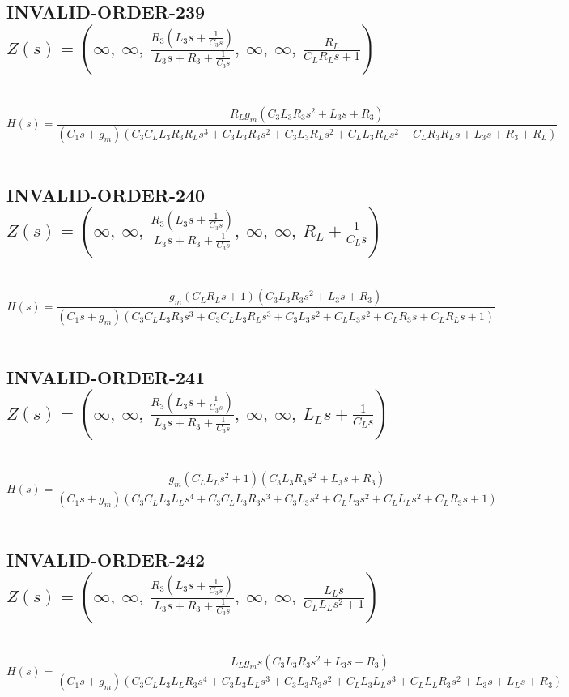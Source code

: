 \documentclass{article}
\begin{document}
\subsection{INVALID-ORDER-239 $Z(s) = \left( \infty, \  \infty, \  \frac{R_{3} \left(L_{3} s + \frac{1}{C_{3} s}\right)}{L_{3} s + R_{3} + \frac{1}{C_{3} s}}, \  \infty, \  \infty, \  \frac{R_{L}}{C_{L} R_{L} s + 1}\right)$ } \ 
\textbf{\[H(s) = \frac{R_{L} g_{m} \left(C_{3} L_{3} R_{3} s^{2} + L_{3} s + R_{3}\right)}{\left(C_{1} s + g_{m}\right) \left(C_{3} C_{L} L_{3} R_{3} R_{L} s^{3} + C_{3} L_{3} R_{3} s^{2} + C_{3} L_{3} R_{L} s^{2} + C_{L} L_{3} R_{L} s^{2} + C_{L} R_{3} R_{L} s + L_{3} s + R_{3} + R_{L}\right)}\] } \ 
\subsection{INVALID-ORDER-240 $Z(s) = \left( \infty, \  \infty, \  \frac{R_{3} \left(L_{3} s + \frac{1}{C_{3} s}\right)}{L_{3} s + R_{3} + \frac{1}{C_{3} s}}, \  \infty, \  \infty, \  R_{L} + \frac{1}{C_{L} s}\right)$ } \ 
\textbf{\[H(s) = \frac{g_{m} \left(C_{L} R_{L} s + 1\right) \left(C_{3} L_{3} R_{3} s^{2} + L_{3} s + R_{3}\right)}{\left(C_{1} s + g_{m}\right) \left(C_{3} C_{L} L_{3} R_{3} s^{3} + C_{3} C_{L} L_{3} R_{L} s^{3} + C_{3} L_{3} s^{2} + C_{L} L_{3} s^{2} + C_{L} R_{3} s + C_{L} R_{L} s + 1\right)}\] } \ 
\subsection{INVALID-ORDER-241 $Z(s) = \left( \infty, \  \infty, \  \frac{R_{3} \left(L_{3} s + \frac{1}{C_{3} s}\right)}{L_{3} s + R_{3} + \frac{1}{C_{3} s}}, \  \infty, \  \infty, \  L_{L} s + \frac{1}{C_{L} s}\right)$ } \ 
\textbf{\[H(s) = \frac{g_{m} \left(C_{L} L_{L} s^{2} + 1\right) \left(C_{3} L_{3} R_{3} s^{2} + L_{3} s + R_{3}\right)}{\left(C_{1} s + g_{m}\right) \left(C_{3} C_{L} L_{3} L_{L} s^{4} + C_{3} C_{L} L_{3} R_{3} s^{3} + C_{3} L_{3} s^{2} + C_{L} L_{3} s^{2} + C_{L} L_{L} s^{2} + C_{L} R_{3} s + 1\right)}\] } \ 
\subsection{INVALID-ORDER-242 $Z(s) = \left( \infty, \  \infty, \  \frac{R_{3} \left(L_{3} s + \frac{1}{C_{3} s}\right)}{L_{3} s + R_{3} + \frac{1}{C_{3} s}}, \  \infty, \  \infty, \  \frac{L_{L} s}{C_{L} L_{L} s^{2} + 1}\right)$ } \ 
\textbf{\[H(s) = \frac{L_{L} g_{m} s \left(C_{3} L_{3} R_{3} s^{2} + L_{3} s + R_{3}\right)}{\left(C_{1} s + g_{m}\right) \left(C_{3} C_{L} L_{3} L_{L} R_{3} s^{4} + C_{3} L_{3} L_{L} s^{3} + C_{3} L_{3} R_{3} s^{2} + C_{L} L_{3} L_{L} s^{3} + C_{L} L_{L} R_{3} s^{2} + L_{3} s + L_{L} s + R_{3}\right)}\] } \ 
\end{document}

